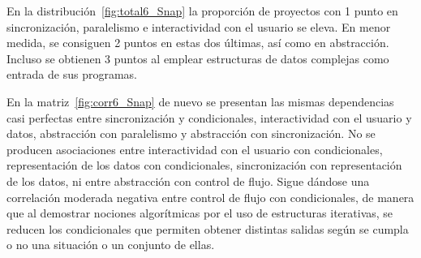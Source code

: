 \documentclass[a4paper, 12pt]{book}
\begin{document}
En la distribución~\ref{fig:total6_Snap} la proporción de proyectos con 1 punto en sincronización, paralelismo e interactividad con el usuario se eleva. En menor medida, se consiguen 2 puntos en estas dos últimas, así como en abstracción. Incluso se obtienen 3 puntos al emplear estructuras de datos complejas como entrada de sus programas.

En la matriz~\ref{fig:corr6_Snap} de nuevo se presentan las mismas dependencias casi perfectas entre sincronización y condicionales, interactividad con el usuario y datos, abstracción con paralelismo y abstracción con sincronización. No se producen asociaciones entre interactividad con el usuario con condicionales, representación de los datos con condicionales, sincronización con representación de los datos, ni entre abstracción con control de flujo. Sigue dándose una correlación moderada negativa entre control de flujo con condicionales, de manera que al demostrar nociones algorítmicas por el uso de estructuras iterativas, se reducen los condicionales que permiten obtener distintas salidas según se cumpla o no una situación o un conjunto de ellas.
\end{document}

